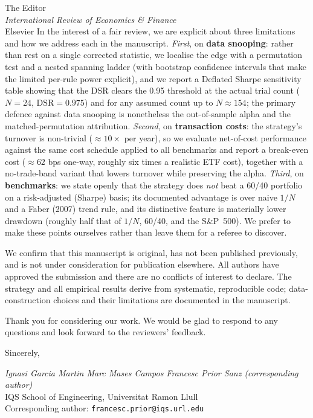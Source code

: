 \documentclass[11pt,a4paper]{letter}
\begin{document}
\begin{letter}{The Editor\\\textit{International Review of Economics \& Finance}\\Elsevier}
In the interest of a fair review, we are explicit about three limitations and how
we address each in the manuscript. \emph{First}, on \textbf{data snooping}: rather
than rest on a single corrected statistic, we localise the edge with a permutation
test and a nested spanning ladder (with bootstrap confidence intervals that make the
limited per-rule power explicit), and we report a Deflated Sharpe sensitivity table showing that the DSR
clears the 0.95 threshold at the actual trial count ($N=24$,
$\mathrm{DSR}=0.975$) and for any assumed count up to $N\approx154$; the primary defence against data snooping is nonetheless
the out-of-sample alpha and the matched-permutation attribution. \emph{Second}, on \textbf{transaction costs}: the strategy's
turnover is non-trivial ($\approx 10\times$ per year), so we evaluate net-of-cost
performance against the same cost schedule applied to all benchmarks and report a
break-even cost ($\approx 62$ bps one-way, roughly six times a realistic ETF cost),
together with a no-trade-band variant that lowers turnover while preserving the
alpha. \emph{Third}, on \textbf{benchmarks}: we state openly that the strategy does
\emph{not} beat a 60/40 portfolio on a risk-adjusted (Sharpe) basis; its
documented advantage is over naive $1/N$ and a Faber (2007) trend rule, and its
distinctive feature is materially lower drawdown (roughly half that of $1/N$,
60/40, and the S\&P~500). We prefer to make these points ourselves rather than
leave them for a referee to discover.

We confirm that this manuscript is original, has not been published previously, and
is not under consideration for publication elsewhere. All authors have approved the
submission and there are no conflicts of interest to declare. The strategy and all
empirical results derive from systematic, reproducible code; data-construction
choices and their limitations are documented in the manuscript.

Thank you for considering our work. We would be glad to respond to any questions and
look forward to the reviewers' feedback.

\closing{Sincerely,}

\vspace{1em}
\textit{Ignasi Garcia Martin \quad\textbullet\quad Marc Mases Campos
\quad\textbullet\quad Francesc Prior Sanz (corresponding author)}\\
IQS School of Engineering, Universitat Ramon Llull\\
Corresponding author: \texttt{francesc.prior@iqs.url.edu}

\end{letter}
\end{document}
